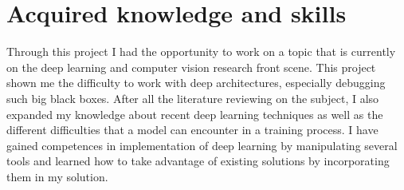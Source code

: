 \documentclass[12pt, a4paper]{report}
\begin{document}
		\section*{Acquired knowledge and skills}
			Through this project I had the opportunity to work on a topic that is currently on the deep learning and computer vision research front scene.
			This project shown me the difficulty to work with deep architectures, especially debugging such big black boxes.
			After all the literature reviewing on the subject, I also expanded my knowledge about recent deep learning techniques as well as the different difficulties that a model can encounter in a training process.
			I have gained competences in implementation of deep learning by manipulating several tools and learned how to take advantage of existing solutions by incorporating them in my solution.
	
	
	\appendix
\end{document}
